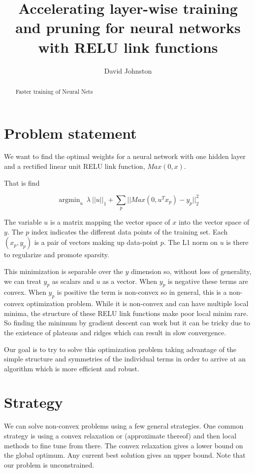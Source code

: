\documentclass{article}
\DeclareMathOperator*{\argmin}{argmin}
\begin{document}
\title{Accelerating layer-wise training and pruning for neural networks
with RELU link functions}
\author{David Johnston}

\maketitle

\begin{abstract}
Faster training of Neural Nets
\end{abstract}

\section{Problem statement}

We want to find the optimal weights for a neural network with one hidden layer
and a rectified linear unit RELU link function, $Max(0, x)$.

That is find

\[
\argmin_u ~ \lambda ~ ||u||_1 + \sum_p || Max(0, u^T x_p) - y_p||_2^2
\]

The variable $u$ is a matrix mapping the vector space of $x$ into the vector
space of $y$. The $p$ index indicates the different data points of the
training set. Each $(x_p, y_p)$ is a pair of vectors making up data-point $p$.
The L1 norm on $u$ is there to regularize and promote sparsity.

This minimization is separable over the $y$ dimension so, without loss of
generality, we can treat $y_p$ as scalars and $u$ as a vector.
When $y_p$ is negative these terms are convex. When $y_p$ is positive the
term is non-convex so in general, this is a non-convex optimization problem.
While it is non-convex and can have multiple local minima, the structure of
these RELU link functions make poor local minim rare. So finding the minimum
by gradient descent can work but it can be tricky due to the existence of
plateaus and ridges which can result in slow convergence.

Our goal is to try to solve this optimization problem taking advantage of the
simple structure and symmetries of the individual terms in order to arrive at an
algorithm which is more efficient and robust.

\section{Strategy}

We can solve non-convex problems using a few general strategies. One common
strategy is using a convex relaxation or (approximate thereof) and then
local methods to fine tune from there. The convex relaxation gives a lower
bound on the global optimum. Any current best solution gives an upper bound.
Note that our problem is unconstrained.
\end{document}
